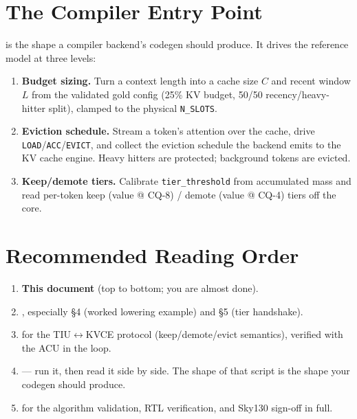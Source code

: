 \documentclass[11pt]{article}
\begin{document}
\section{The Compiler Entry Point}
\label{sec:entry}

 is the shape a compiler backend's codegen should
produce. It drives the reference model at three levels:

\begin{enumerate}
\item \textbf{Budget sizing.} Turn a context length into a cache size $C$ and
      recent window $L$ from the validated gold config (25\% KV budget, 50/50
      recency/heavy-hitter split), clamped to the physical \texttt{N\_SLOTS}.
\item \textbf{Eviction schedule.} Stream a token's attention over the cache, drive
      \texttt{LOAD}/\texttt{ACC}/\texttt{EVICT}, and collect the eviction schedule
      the backend emits to the KV cache engine. Heavy hitters are protected;
      background tokens are evicted.
\item \textbf{Keep/demote tiers.} Calibrate \texttt{tier\_threshold} from
      accumulated mass and read per-token keep (value @ CQ-8) / demote (value @
      CQ-4) tiers off the core.
\end{enumerate}

\section{Recommended Reading Order}
\label{sec:reading}

\begin{enumerate}
\item \textbf{This document} (top to bottom; you are almost done).
\item {}, especially \S4 (worked
      lowering example) and \S5 (tier handshake).
\item {} for the TIU$\leftrightarrow$KVCE protocol
      (keep/demote/evict semantics), verified with the ACU in the loop.
\item {} --- run it, then read it
      side by side. The shape of that script is the shape your codegen should
      produce.
\item {} for the algorithm validation, RTL
      verification, and Sky130 sign-off in full.
\end{enumerate}
\end{document}
